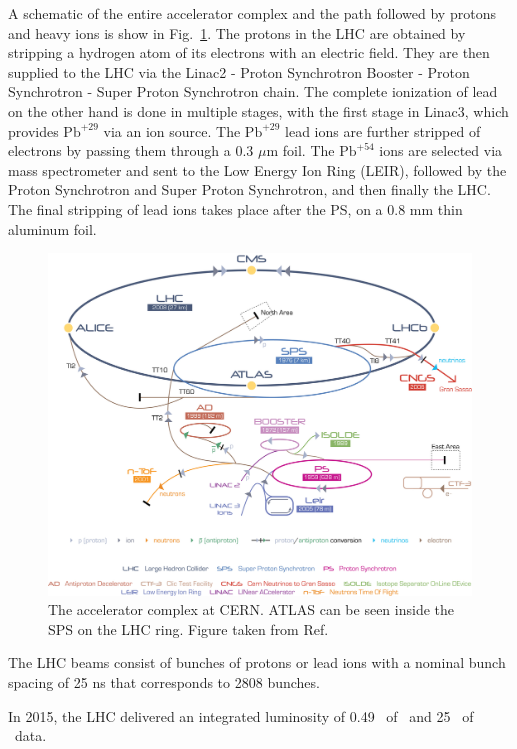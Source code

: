 A schematic of the entire accelerator complex and the path followed by protons and heavy ions is show in Fig.~\ref{fig:cern}. The protons in the LHC are obtained by stripping a hydrogen atom of its electrons with an electric field. They are then supplied to the LHC via the Linac2 - Proton Synchrotron Booster - Proton Synchrotron - Super Proton Synchrotron chain. The complete ionization of lead on the other hand is done in multiple stages, with the first stage in Linac3, which provides $\mathrm{Pb}^{+29}$ via an ion source. The $\mathrm{Pb}^{+29}$ lead ions are further stripped of electrons by passing them through a 0.3 $\mu$m foil. The $\mathrm{Pb}^{+54}$ ions are selected via mass spectrometer and sent to the Low Energy Ion Ring (LEIR), followed by the Proton Synchrotron and Super Proton Synchrotron, and then finally the LHC. The final stripping of lead ions takes place after the PS, on a 0.8 mm thin aluminum foil.

\begin{figure}[ht]
	\centering
	\includegraphics[width=1.\textwidth]{figures/setup/cern.jpg} %
	\caption{The accelerator complex at CERN. ATLAS can be seen inside the SPS on the LHC ring. Figure taken from Ref.~\cite{Christiane:1260465}}
	\label{fig:cern}%
\end{figure}

The LHC beams consist of bunches of protons or lead ions with a nominal bunch spacing of 25 ns that corresponds to 2808 bunches. 

In 2015, the LHC delivered an integrated luminosity of 0.49 \pb\ of \pbpb\ and 25 \pb\ of \pp\ data.


